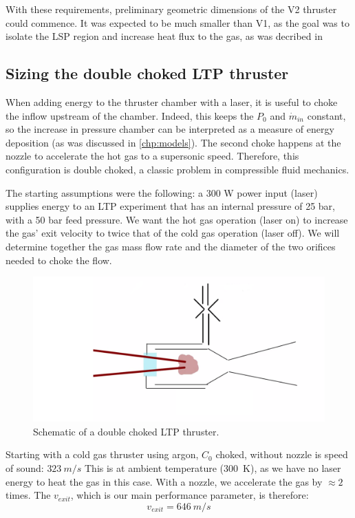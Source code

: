             With these requirements, preliminary geometric dimensions of the V2 thruster could commence. It was expected to be much smaller than V1, as the goal was to isolate the LSP region and increase heat flux to the gas, as was decribed in \

        \subsection{Sizing the double choked LTP thruster} 

            When adding energy to the thruster chamber with a laser, it is useful to choke the inflow upstream of the chamber. Indeed, this keeps the $P_0$ and $\dot{m}_{in}$ constant, so the increase in pressure chamber can be interpreted as a measure of energy deposition (as was discussed in \autoref{chp:models}).
            The second choke happens at the nozzle to accelerate the hot gas to a supersonic speed. Therefore, this configuration is double choked, a classic problem in compressible fluid mechanics.
            
            The starting assumptions were the following: a 300 W power input (laser) supplies energy to an LTP experiment that has an internal pressure of 25 bar, with a 50 bar feed pressure. We want the hot gas operation (laser on) to increase the gas' exit velocity to twice that of the cold gas operation (laser off). We will determine together the gas mass flow rate and the diameter of the two orifices needed to choke the flow.

            \begin{figure}[h]
            \centering
            \includegraphics[width=0.8\linewidth]{assets/3 design/double choked sizing.png}
            \caption{\label{fig:double choke sizing}Schematic of a double choked LTP thruster.}
            \end{figure}
            
            
            Starting with a cold gas thruster using argon, $C_0$ choked, without nozzle is speed of sound: $323 \:m/s$ This is at ambient temperature (\qty{300}{K}), as we have no laser energy to heat the gas in this case. With a nozzle, we accelerate the gas by $\approx 2$ times. The $v_{exit}$, which is our main performance parameter, is therefore: 
            \[v_{exit} = 646\: m/s\]
            
